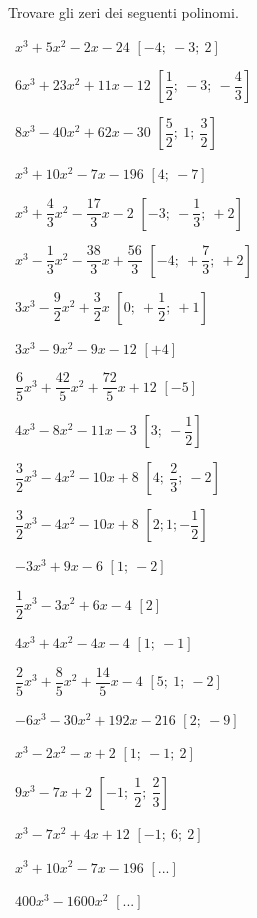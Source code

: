 \begin{esercizio}[*]
 \label{ese:5.1}
Trovare gli zeri dei seguenti polinomi.
\begin{htmulticols}{2}
 \begin{enumeratea}
 \item~\(x^3+5x^2-2x-24\) \hfill \(\left[-4;~-3;~2\right]\)
 \item~\(6x^3+23x^2+11x-12\) \hfill \(\left[\dfrac 1 2;~-3;~-\dfrac 4 
3\right]\)
 \item~\(8x^3-40x^2+62x-30\) \hfill \(\left[\dfrac 5 2;~1;~\dfrac 3 
2\right]\)
 \item~\(x^3+10x^2-7x-196\) \hfill \(\left[4;~-7\right]\)
 \item~\(x^3+\dfrac 4 3x^2-\dfrac{17} 3x-2\) 
  \hfill \(\left[-3;~-\dfrac 1 3;~+2\right]\)
 \item~\(x^3-\dfrac 1 3x^2-\dfrac{38} 3x+\dfrac{56} 3\) 
  \hfill \(\left[-4;~+\dfrac 7 3;~+2\right]\)
 \item~\(3x^3-\dfrac 9 2x^2+\dfrac 3 2x\) \hfill \(\left[0;~+\dfrac 1 
2;~+1\right]\)
 \item~\(3x^3-9x^2-9x-12\) \hfill \(\left[+4\right]\)
 \item~\(\dfrac 6 5x^3+\dfrac{42} 5x^2+\dfrac{72} 5x+12\) \hfill 
\(\left[-5\right]\)
 \item~\(4x^3-8x^2-11x-3\) \hfill \(\left[3;~-\dfrac 1 2\right]\)
 \item~\(\dfrac 3 2x^3-4x^2-10x+8\) \hfill \(\left[4;~\dfrac 2 
3;~-2\right]\)
 \item~\(\dfrac 3 2x^3-4x^2-10x+8\) \hfill \(\left[2;1;-\dfrac 1 2\right]\)
 \item~\(-3x^3+9x-6\) \hfill \(\left[1;~-2\right]\)
 \item~\(\dfrac 1 2x^3-3x^2+6x-4\) \hfill \(\left[2\right]\)
 \item~\(4x^3+4x^2-4x-4\) \hfill \(\left[1;~-1\right]\)
 \item~\(\dfrac 2 5x^3+\dfrac 8 5x^2+\dfrac{14} 5x-4\) \hfill 
\(\left[5;~1;~-2\right]\)
 \item~\(-6x^3-30x^2+192x-216\) \hfill \(\left[2;~-9\right]\)
 \item~\(x^3-2x^2-x+2\) \hfill \(\left[1;~-1;~2\right]\)
 \item~\(9x^3-7x+2\) \hfill \(\left[-1;~\dfrac 1 2;~\dfrac 2 3\right]\)
 \item~\(x^3-7x^2+4x+12\) \hfill \(\left[-1;~6;~2\right]\)
 \item~\( x^3+10x^2-7x-196 \) \hfill \(\left[...\right]\)
 \item~\( 400x^3-1600x^2\) \hfill \(\left[...\right]\)

\end{enumeratea}
\end{htmulticols}
\end{esercizio}
